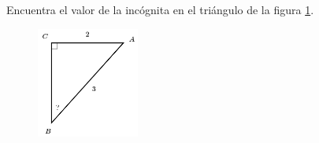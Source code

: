 \question[15]  Encuentra el valor de la incógnita en el triángulo de la figura \ref{fig:angle_functrig_08}.
\begin{figure}[H]
    \begin{center}
        \includegraphics[width=0.3\textwidth]{../images/angle_functrig_08.png}
    \end{center}
    \caption{}
    \label{fig:angle_functrig_08}
\end{figure}